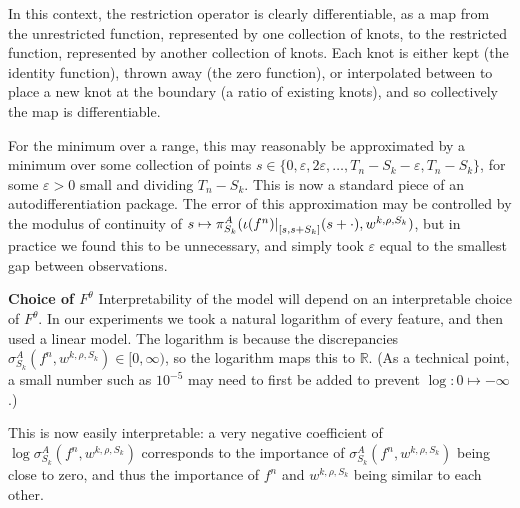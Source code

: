 \documentclass{article}
\theoremstyle{plain}
\theoremstyle{definition}
\newcommand{\reals}{\mathbb{R}}
\newcommand{\restr}[2]{{\left.\kern-\nulldelimiterspace #1 \right|_{#2}}}
\newcommand{\boldheading}[1]{

\textbf{#1}\quad}
\begin{document}
	In this context, the restriction operator is clearly differentiable, as a map from the unrestricted function, represented by one collection of knots, to the restricted function, represented by another collection of knots. Each knot is either kept (the identity function), thrown away (the zero function), or interpolated between to place a new knot at the boundary (a ratio of existing knots), and so collectively the map is differentiable.
	
	For the minimum over a range, this may reasonably be approximated by a minimum over some collection of points $s \in \{0, \varepsilon, 2 \varepsilon, \ldots, T_n - S_k - \varepsilon, T_n - S_k\}$, for some $\varepsilon > 0$ small and dividing $T_n - S_k$. This is now a standard piece of an autodifferentiation package. The error of this approximation may be controlled by the modulus of continuity of $s \mapsto \pi^A_{S_k}(\restr{\iota(f^n)}{[s, s + S_k]}(s + \cdot), w^{k, \rho, S_k})$, but in practice we found this to be unnecessary, and simply took $\varepsilon$ equal to the smallest gap between observations.
	
	\boldheading{Choice of $F^\theta$}
	Interpretability of the model will depend on an interpretable choice of $F^\theta$. In our experiments we took a natural logarithm of every feature, and then used a linear model. The logarithm is because the discrepancies $\sigma^A_{S_k}(f^n, w^{k, \rho, S_k}) \in [0, \infty)$, so the logarithm maps this to $\reals$. (As a technical point, a small number such as $10^{-5}$ may need to first be added to prevent $\log \colon 0 \mapsto -\infty$.)
	
	This is now easily interpretable: a very negative coefficient of $\log \sigma^A_{S_k}(f^n, w^{k, \rho, S_k})$ corresponds to the importance of $\sigma^A_{S_k}(f^n, w^{k, \rho, S_k})$ being close to zero, and thus the importance of $f^n$ and $w^{k, \rho, S_k}$ being similar to each other.
	
	
	
\end{document}
